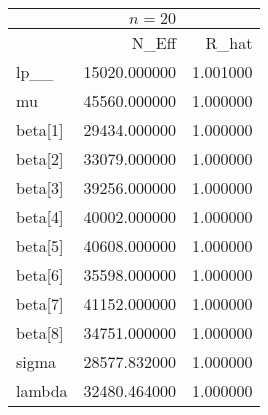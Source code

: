 \begin{tabular}{lrr}
& $ n = 20 $ & \\
\toprule
 & N\_Eff & R\_hat \\
\midrule
lp\_\_ & 15020.000000 & 1.001000 \\
mu & 45560.000000 & 1.000000 \\
beta[1] & 29434.000000 & 1.000000 \\
beta[2] & 33079.000000 & 1.000000 \\
beta[3] & 39256.000000 & 1.000000 \\
beta[4] & 40002.000000 & 1.000000 \\
beta[5] & 40608.000000 & 1.000000 \\
beta[6] & 35598.000000 & 1.000000 \\
beta[7] & 41152.000000 & 1.000000 \\
beta[8] & 34751.000000 & 1.000000 \\
sigma & 28577.832000 & 1.000000 \\
lambda & 32480.464000 & 1.000000 \\
\bottomrule
\end{tabular}
